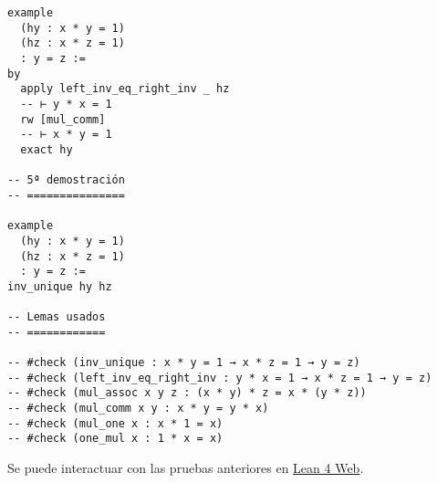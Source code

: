 \begin{verbatim}
example
  (hy : x * y = 1)
  (hz : x * z = 1)
  : y = z :=
by
  apply left_inv_eq_right_inv _ hz
  -- ⊢ y * x = 1
  rw [mul_comm]
  -- ⊢ x * y = 1
  exact hy

-- 5ª demostración
-- ===============

example
  (hy : x * y = 1)
  (hz : x * z = 1)
  : y = z :=
inv_unique hy hz

-- Lemas usados
-- ============

-- #check (inv_unique : x * y = 1 → x * z = 1 → y = z)
-- #check (left_inv_eq_right_inv : y * x = 1 → x * z = 1 → y = z)
-- #check (mul_assoc x y z : (x * y) * z = x * (y * z))
-- #check (mul_comm x y : x * y = y * x)
-- #check (mul_one x : x * 1 = x)
-- #check (one_mul x : 1 * x = x)
\end{verbatim}
Se puede interactuar con las pruebas anteriores en \href{https://lean.math.hhu.de/\#url=https://raw.githubusercontent.com/jaalonso/Calculemus2/main/src/Unicidad\_de\_inversos\_en\_monoides.lean}{Lean 4 Web}.

